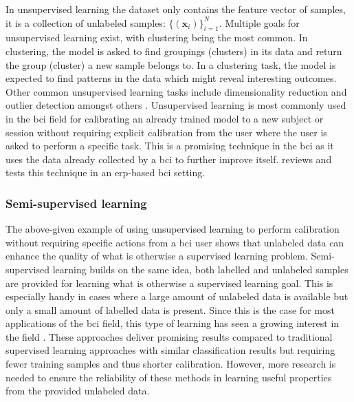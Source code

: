 In unsupervised learning the dataset only contains the feature vector of samples, it is a collection of unlabeled samples: $\{(\textbf{x}_i)\}^N_{i=1}$.
Multiple goals for unsupervised learning exist, with clustering being the most common.
In clustering, the model is asked to find groupings (clusters) in its data and return the group (cluster) a new sample belongs to.
In a clustering task, the model is expected to find patterns in the data which might reveal interesting outcomes.
Other common unsupervised learning tasks include dimensionality reduction and outlier detection amongst others \citep{ml_book}.
Unsupervised learning is most commonly used in the \gls{bci} field for calibrating an already trained model to a new subject or session without requiring explicit calibration from the user where the user is asked to perform a specific task.
This is a promising technique in the \gls{bci} as it uses the data already collected by a \gls{bci} to further improve itself.
 reviews and tests this technique in an \gls{erp}-based \gls{bci} setting.



\subsubsection{Semi-supervised learning}
\label{subsubsec:processing_signals_ml_and_dl_tyes_of_learning_supervision_semisupervised}

The above-given example of using unsupervised learning to perform calibration without requiring specific actions from a \gls{bci} user shows that unlabeled data can enhance the quality of what is otherwise a supervised learning problem.
Semi-supervised learning builds on the same idea, both labelled and unlabeled samples are provided for learning what is otherwise a supervised learning goal.
This is especially handy in cases where a large amount of unlabeled data is available but only a small amount of labelled data is present.
Since this is the case for most applications of the \gls{bci} field, this type of learning has seen a growing interest in the field \citep{semi_supervised_bci1, semi_supervised_bci2, semi_supervised_bci3}.
These approaches deliver promising results compared to traditional supervised learning approaches with similar classification results but requiring fewer training samples and thus shorter calibration.
However, more research is needed to ensure the reliability of these methods in learning useful properties from the provided unlabeled data.


